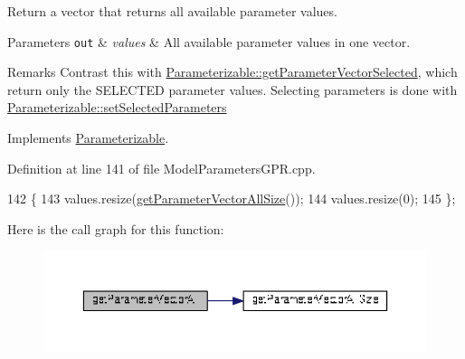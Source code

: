 Return a vector that returns all available parameter values. 


\begin{DoxyParams}[1]{Parameters}
\mbox{\tt out}  & {\em values} & All available parameter values in one vector. \\
\hline
\end{DoxyParams}
\begin{DoxyRemark}{Remarks}
Contrast this with \hyperlink{classDmpBbo_1_1Parameterizable_aab955bec57f074a991b8be31d6ce54ca}{Parameterizable\+::get\+Parameter\+Vector\+Selected}, which return only the S\+E\+L\+E\+C\+T\+E\+D parameter values. Selecting parameters is done with \hyperlink{classDmpBbo_1_1Parameterizable_a8a976b5db2d1809ece10e431816f0f27}{Parameterizable\+::set\+Selected\+Parameters} 
\end{DoxyRemark}


Implements \hyperlink{classDmpBbo_1_1Parameterizable_addcd9c243e3d9e104c9a4513c81e3b5b}{Parameterizable}.



Definition at line 141 of file Model\+Parameters\+G\+P\+R.\+cpp.


\begin{DoxyCode}
142 \{
143   values.resize(\hyperlink{classDmpBbo_1_1ModelParametersGPR_ab24d2485b3b795b516f4844f225100eb}{getParameterVectorAllSize}());
144   values.resize(0);
145 \};
\end{DoxyCode}


Here is the call graph for this function\+:
\nopagebreak
\begin{figure}[H]
\begin{center}
\leavevmode
\includegraphics[width=350pt]{classDmpBbo_1_1ModelParametersGPR_a29429ff2771d1e56cfba7250d38da4b1_cgraph}
\end{center}
\end{figure}


